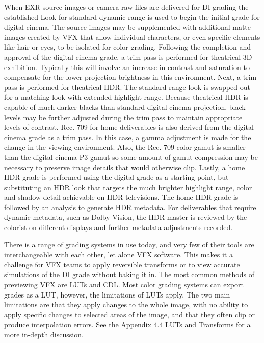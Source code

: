 When EXR source images or camera raw files are delivered for DI grading the established Look for standard dynamic range is used to begin the initial grade for digital cinema. The source images may be supplemented with additional matte images created by VFX that allow individual characters, or even specific elements like hair or eyes, to be isolated for color grading. Following the completion and approval of the digital cinema grade, a trim pass is performed for theatrical 3D exhibition. Typically this will involve an increase in contrast and saturation to compensate for the lower projection brightness in this environment. Next, a trim pass is performed for theatrical HDR. The standard range look is swapped out for a matching look with extended highlight range. Because theatrical HDR is capable of much darker blacks than standard digital cinema projection, black levels may be further adjusted during the trim pass to maintain appropriate levels of contrast. Rec. 709 for home deliverables is also derived from the digital cinema grade as a trim pass. In this case, a gamma adjustment is made for the change in the viewing environment. Also, the Rec. 709 color gamut is smaller than the digital cinema P3 gamut so some amount of gamut compression may be necessary to preserve image details that would otherwise clip. Lastly, a home HDR grade is performed using the digital grade as a starting point, but substituting an HDR look that targets the much brighter highlight range, color and shadow detail achievable on HDR televisions. The home HDR grade is followed by an analysis to generate HDR metadata. For deliverables that require dynamic metadata, such as Dolby Vision, the HDR master is reviewed by the colorist on different displays and further metadata adjustments recorded.

There is a range of grading systems in use today, and very few of their tools are interchangeable with each other, let alone VFX software. This makes it a challenge for VFX teams to apply reversible transforms or to view accurate simulations of the DI grade without baking it in. The most common methods of previewing VFX are LUTs and CDL. Most color grading systems can export grades as a LUT, however, the limitations of LUTs apply. The two main limitations are that they apply changes to the whole image, with no ability to apply specific changes to selected areas of the image, and that they often clip or produce interpolation errors. See the Appendix 4.4 LUTs and Transforms for a more in-depth discussion. 

